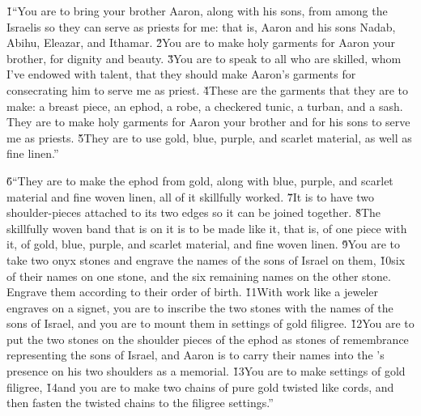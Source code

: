 \v{1}``You are to bring your brother Aaron, along with his sons, from among the Israelis so they can serve as priests for me: that is, Aaron and his sons Nadab, Abihu, Eleazar, and Ithamar. \v{2}You are to make holy garments for Aaron your brother, for dignity and beauty. \v{3}You are to speak to all who are skilled, whom I've endowed with talent, that they should make Aaron's garments for consecrating him to serve me as priest. \v{4}These are the garments that they are to make: a breast piece, an ephod, a robe, a checkered tunic, a turban, and a sash. They are to make holy garments for Aaron your brother and for his sons to serve me as priests. \v{5}They are to use gold, blue, purple, and scarlet material, as well as fine linen.''

\v{6}``They are to make the ephod from gold, along with blue, purple, and scarlet material and fine woven linen, all of it skillfully worked. \v{7}It is to have two shoulder-pieces attached to its two edges so it can be joined together. \v{8}The skillfully woven band that is on it is to be made like it, that is, of one piece with it, of gold, blue, purple, and scarlet material, and fine woven linen. \v{9}You are to take two onyx stones and engrave the names of the sons of Israel on them, \v{10}six of their names on one stone, and the six remaining names on the other stone. Engrave them according to their order of birth. \v{11}With work like a jeweler engraves on a signet, you are to inscribe the two stones with the names of the sons of Israel, and you are to mount them in settings of gold filigree. \v{12}You are to put the two stones on the shoulder pieces of the ephod as stones of remembrance representing the sons of Israel, and Aaron is to carry their names into the 's presence on his two shoulders as a memorial. \v{13}You are to make settings of gold filigree, \v{14}and you are to make two chains of pure gold twisted like cords, and then fasten the twisted chains to the filigree settings.''

